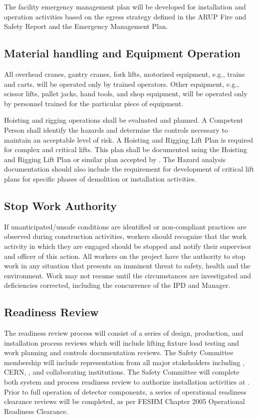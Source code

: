 The facility emergency management plan will be developed for
installation and operation activities based on the egress strategy
defined in the ARUP Fire and Safety Report and the \surf Emergency
Management Plan.

\subsection{Material handling and Equipment Operation}

All overhead cranes, gantry cranes, fork lifts, motorized equipment,
e.g., trains and carts, will be operated only by trained
operators. Other equipment, e.g., scissor lifts, pallet jacks, hand
tools, and shop equipment, will be operated only by personnel trained
for the particular piece of equipment.

Hoisting and rigging operations shall be evaluated and planned.  A
Competent Person shall identify the hazards and determine the controls
necessary to maintain an acceptable level of risk.  A Hoisting and
Rigging Lift Plan is required for complex and critical lifts. This
plan shall be documented using the \fnal Hoisting and Rigging Lift
Plan or similar plan accepted by \fnal. The Hazard analysis
documentation should also include the requirement for development of
critical lift plans for specific phases of demolition or installation
activities.

\subsection{Stop Work Authority}

If unanticipated/unsafe conditions are identified or non-compliant
practices are observed during construction activities, workers should
recognize that the work activity in which they are engaged should be
stopped and notify their supervisor and  officer of
this action. All workers on the  project have the
authority to stop work in any situation that presents an imminent
threat to safety, health and the environment. Work may not resume
until the circumstances are investigated and deficiencies corrected,
including the concurrence of the  IPD 
and   Manager.

\subsection{ Readiness Review}

The  readiness review process will consist of a series of
design, production, and installation process reviews which will
include lifting fixture load testing and work planning and controls
documentation reviews. The  Safety Committee membership
will include representation from all major stakeholders including
\fnal, CERN, \surf,  and collaborating institutions. The
 Safety Committee will complete both system and process
readiness review to authorize installation activities at \surf.  Prior
to full operation of detector components, a series of operational
readiness clearance reviews will be completed, as per FESHM Chapter
2005 Operational Readiness Clearance.

